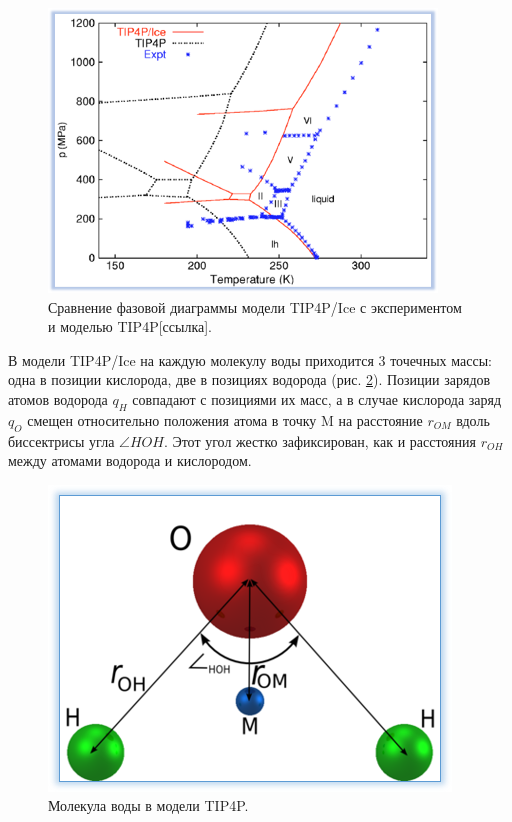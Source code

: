 \begin{figure}[H]
    \centering
    \includegraphics[width=.65\linewidth]{figures/tip4pdiag.png}
    \caption{Сравнение фазовой диаграммы модели TIP4P/Ice с экспериментом и моделью TIP4P[ссылка].}
    \label{fig2.6.2}
\end{figure}

В модели TIP4P/Ice на каждую молекулу воды приходится 3 точечных массы: одна в позиции кислорода, две в позициях водорода (рис. \ref{fig2.6.3}). Позиции зарядов атомов водорода $q_H$ совпадают с позициями их масс, а в случае кислорода заряд $q_O$ смещен относительно положения атома в точку M на расстояние $r_{OM}$ вдоль биссектрисы угла $\angle HOH$. Этот угол жестко зафиксирован, как и расстояния $r_{OH}$ между атомами водорода и кислородом.

\begin{figure}[H]
    \centering
    \includegraphics[width=.6\linewidth]{figures/water_mol.png}
    \caption{Молекула воды в модели TIP4P.}
    \label{fig2.6.3}
\end{figure}

